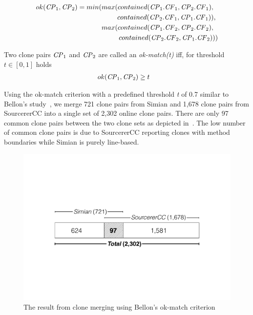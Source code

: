 \documentclass[10pt,journal,compsoc]{IEEEtran}
\newcommand{\squeezeup}{\vspace{-0.5mm}}
\begin{document}
\begin{align*}
ok(\textrm{\textit{CP}}_1,\textrm{\textit{CP}}_2) = min(max(contained(\textrm{\textit{CP}}_1.\textrm{\textit{CF}}_1,\textrm{\textit{CP}}_2.\textrm{\textit{CF}}_1),~~ \\ contained(\textrm{\textit{CP}}_2.\textrm{\textit{CF}}_1,\textrm{\textit{CP}}_1.\textrm{\textit{CF}}_1)),~
\\ max(contained(\textrm{\textit{CP}}_1.\textrm{\textit{CF}}_2,\textrm{\textit{CP}}_2.\textrm{\textit{CF}}_2),~~ \\contained(\textrm{\textit{CP}}_2.\textrm{\textit{CF}}_2,\textrm{\textit{CP}}_1.\textrm{\textit{CF}}_2)))
\end{align*}

\noindent%
Two clone pairs $\textrm{\textit{CP}}_1$ and $\textrm{\textit{CP}}_2$
are called an \textit{ok-match(t)}  iff, for threshold $t \in [0,1]$ holds 
\begin{align*}
ok(\textrm{\textit{CP}}_1,\textrm{\textit{CP}}_2) & \geq t
\end{align*}

Using the ok-match criterion with a predefined threshold \textit{t} of 0.7
similar to Bellon's study~\cite{Bellon2007}, we merge 721 clone pairs from
Simian and 1,678 clone pairs from SourcererCC into a single set of 2,302 online
clone pairs. There are only 97 common clone pairs between the two clone sets 
as depicted in~.  The low number of common
clone pairs is due to SourcererCC reporting clones with method
boundaries while Simian is purely line-based.

\begin{figure}
	\centering
	\includegraphics[width=0.8\linewidth]{clone_merging}
	\caption{The result from clone merging using Bellon's ok-match criterion}
	\label{fig:clonemerging}
\end{figure}
\end{document}
